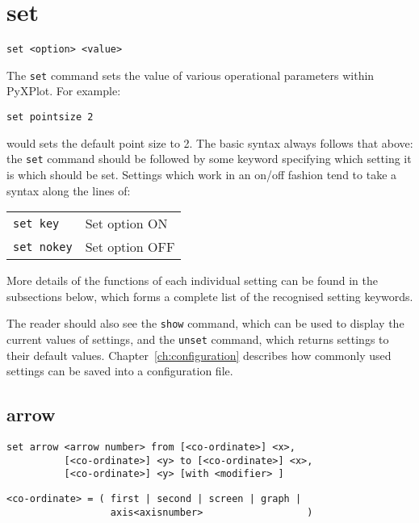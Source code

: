 \section{set}

\begin{verbatim}
set <option> <value>
\end{verbatim}

The {\tt set} command sets the value of various operational parameters within
PyXPlot.  For example:

\begin{verbatim}
set pointsize 2
\end{verbatim}

\noindent would sets the default point size to 2. The basic syntax always
follows that above: the {\tt set} command should be followed by some keyword
specifying which setting it is which should be set.  Settings which work in an
on/off fashion tend to take a syntax along the lines of:

\begin{tabular}{ll}
{\tt set key} & Set option ON \\
{\tt set nokey} & Set option OFF
\end{tabular}

\noindent
More details of the functions of each individual setting can be found in the
subsections below, which forms a complete list of the recognised setting
keywords.

The reader should also see the {\tt show} command, which can be used to display
the current values of settings, and the {\tt unset} command, which returns
settings to their default values. Chapter~\ref{ch:configuration} describes how
commonly used settings can be saved into a configuration file.

\subsection{arrow}

\begin{verbatim}
set arrow <arrow number> from [<co-ordinate>] <x>,
          [<co-ordinate>] <y> to [<co-ordinate>] <x>,
          [<co-ordinate>] <y> [with <modifier> ]
\end{verbatim}

\begin{verbatim}
<co-ordinate> = ( first | second | screen | graph |
                  axis<axisnumber>                  )
\end{verbatim}

